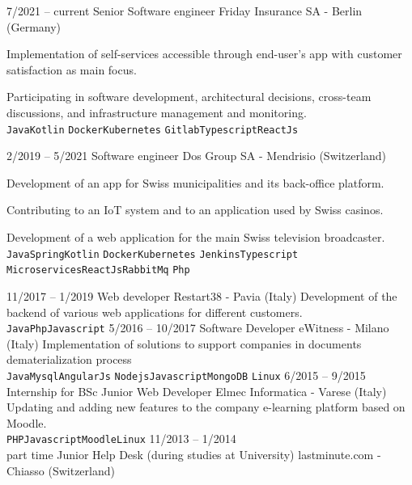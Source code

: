 \documentclass[9pt]{developercv} %
\begin{document}
\begin{entrylist}
    \entry
		{7/2021 -- current}
		{Senior Software engineer}
		{Friday Insurance SA - Berlin (Germany)}
		{Implementation of self-services accessible through end-user's app with customer satisfaction as main focus.

            Participating in software development, architectural decisions, cross-team discussions, and infrastructure management and monitoring.\\
        \texttt{Java}\slashsep\texttt{Kotlin}
        \slashsep\texttt{Docker}\slashsep\texttt{Kubernetes}
        \slashsep\texttt{Gitlab}\slashsep\texttt{Typescript}\slashsep\texttt{ReactJs}}
	\entry
		{2/2019 -- 5/2021}
		{Software engineer}
		{Dos Group SA - Mendrisio (Switzerland)}
		{Development of an app for Swiss municipalities and its back-office platform.

        Contributing to an IoT system and to an application used by Swiss casinos.
        
        Development of a web application for the main Swiss television broadcaster.\\ 
        \texttt{Java}\slashsep\texttt{Spring}\slashsep\texttt{Kotlin}
        \slashsep\texttt{Docker}\slashsep\texttt{Kubernetes}
        \slashsep\texttt{Jenkins}\slashsep\texttt{Typescript}\\
        \texttt{Microservices}\slashsep\texttt{ReactJs}\slashsep\texttt{RabbitMq}
        \slashsep\texttt{Php}}
	\entry
		{11/2017 -- 1/2019}
		{Web developer}
		{Restart38 - Pavia (Italy)}
		{Development of the backend of various web applications for different customers.
		\\ \texttt{Java}\slashsep\texttt{Php}\slashsep\texttt{Javascript}}
	\entry
		{5/2016 -- 10/2017}
		{Software Developer}
		{eWitness - Milano (Italy)}
		{Implementation of solutions to support companies in documents dematerialization process \\
        \texttt{Java}\slashsep\texttt{Mysql}\slashsep\texttt{AngularJs}
        \slashsep\texttt{Nodejs}\slashsep\texttt{Javascript}\slashsep\texttt{MongoDB}
        \slashsep\texttt{Linux}}
	\entry
		{6/2015 -- 9/2015\\\footnotesize{Internship for BSc}}
		{Junior Web Developer}
		{Elmec Informatica - Varese (Italy)}
		{Updating and adding new features to the company e-learning platform based on Moodle.\\
        \texttt{PHP}\slashsep\texttt{Javascript}\slashsep\texttt{Moodle}\slashsep\texttt{Linux}}
	\entry
		{11/2013 -- 1/2014\\\footnotesize{part time}}
		{Junior Help Desk (during studies at University)}
		{lastminute.com - Chiasso (Switzerland)}

\end{entrylist}
\end{document}
